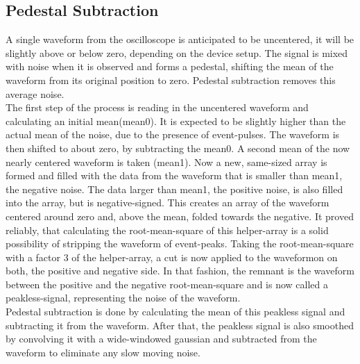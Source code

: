 \documentclass[12pt,article,type=msc,colorback,accentcolor=tud9c]{tudthesis}
\begin{document}
\subsection{Pedestal Subtraction}
\begin{wrapfigure}{R}{0.5\textwidth}
\centering
\texttt{[image: D:/OwnCloudData/00\_WriteUp/04\_Thesis/Pic/Analysis/\{HAM\_T22.0\_Vb68.5.trcFiltered1Zoom]}.pdf}
\caption{\label{fig:CHECSTILE}Pedestal subtraction}
\end{wrapfigure}
A single waveform from the oscilloscope is anticipated to be uncentered, it will be slightly above or below zero, depending on the device setup. The signal is mixed with noise when it is observed and forms a pedestal, shifting the mean of the waveform from its original position to zero. Pedestal subtraction removes this average noise.\\
The first step of the process is reading in the uncentered waveform and calculating an initial mean(mean0). It is expected to be slightly higher than the actual mean of the noise, due to the presence of event-pulses. The waveform is then shifted to about zero, by subtracting the mean0. A second mean of the now nearly centered waveform is taken (mean1). Now a new, same-sized array is formed and filled with the data from the waveform that is smaller than mean1, the negative noise. The data larger than mean1, the positive noise, is also filled into the array, but is negative-signed. This creates an array of the waveform centered around zero and, above the mean, folded towards the negative. It proved reliably, that calculating the root-mean-square of this helper-array is a solid possibility of stripping the waveform of event-peaks. Taking the root-mean-square with a factor 3 of the helper-array, a cut is now applied to the waveformon on both, the positive and negative side. In that fashion, the remnant is the waveform between the positive and the negative root-mean-square and is now called a peakless-signal, representing the noise of the waveform.\\
Pedestal subtraction is done by calculating the mean of this peakless signal and subtracting it from the waveform. After that, the peakless signal is also smoothed by convolving it with a wide-windowed gaussian and subtracted from the waveform to eliminate any slow moving noise.


\end{document}
